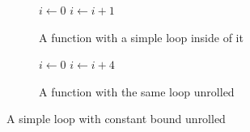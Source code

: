 \begin{figure}
    \begin{subfigure}[b]{0.5\textwidth}
        \centering
        \begin{algorithmic}
                \State $i \gets 0$
                    \State {}
                    \State $i \gets i + 1$
                \EndWhile
            \EndFunction
        \end{algorithmic}
        \caption{A function with a simple loop inside of it}
    \end{subfigure}
    \begin{subfigure}[b]{0.5\textwidth}
        \centering
        \begin{algorithmic}
                \State $i \gets 0$
                    \State {}
                    \State {}
                    \State {}
                    \State {}
                    \State $i \gets i + 4$
                \EndWhile
            \EndFunction
        \end{algorithmic}
        \caption{A function with the same loop unrolled}
    \end{subfigure}
    \caption{A simple loop with constant bound unrolled}
    \label{fig:basics:old-loop-unrolling}
\end{figure}